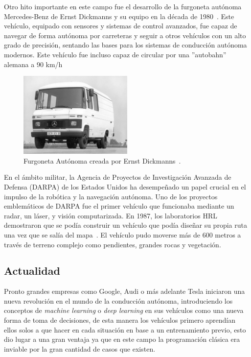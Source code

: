 Otro hito importante en este campo fue el desarrollo de la furgoneta autónoma Mercedes-Benz de Ernst Dickmanns y su equipo en la década de 
1980~\Cite{ernst80}. Este vehículo, equipado con sensores y sistemas de control avanzados, fue capaz de navegar de forma autónoma por 
carreteras y seguir a otros vehículos con un alto grado de precisión, sentando las bases para los sistemas de conducción autónoma modernos. 
Este vehículo fue   incluso capaz de circular por una ''autobahn'' alemana a 90 km/h

\begin{figure}[h]
    \centering
    \includegraphics[width=0.5\textwidth]{images/furgoneta_ernst_dickens.jpeg}
    \caption{Furgoneta Autónoma creada por Ernst Dickmanns~\cite{ernst80}.}
    \label{fig:furgoneta_ernst}
\end{figure}

En el ámbito militar, la Agencia de Proyectos de Investigación Avanzada de Defensa (DARPA) de los Estados Unidos ha desempeñado un 
papel crucial en el impulso de la robótica y la navegación autónoma. Uno de los proyectos emblemáticos de DARPA fue el primer vehículo 
que funcionaba mediante un radar, un láser, y visión computarizada. En 1987, los laboratorios HRL demostraron que se podía construir un 
vehículo que podía diseñar su propia ruta una vez que se salía del mapa~\cite{DARPA20}. El vehículo pudo moverse más de 600 metros a través de terreno 
complejo como pendientes, grandes rocas y vegetación.

\subsection{Actualidad}

Pronto grandes empresas como Google, Audi o más adelante Tesla iniciaron una nueva revolución en el mundo de la conducción autónoma, 
introduciendo los conceptos de \textit{machine learning} o \textit{deep learning} en sus vehículos como una nueva forma de toma de 
decisiones, de esta manera los vehículos primero aprendían ellos solos a que hacer en cada situación en base a un entrenamiento previo, 
esto dio lugar a una gran ventaja ya que en este campo la programación clásica era inviable por la gran cantidad de casos que existen.

